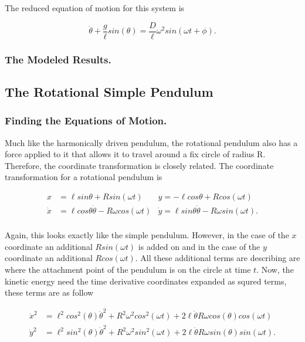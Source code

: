 \documentclass[runningheads]{llncs}
\begin{document}
The reduced equation of motion for this system is 

$$
\ddot{\theta} + \frac{g}{\ell} sin(\theta) = \frac{D}{\ell}\omega^{2} sin(\omega t + \phi).
$$

\subsubsection{The Modeled Results.}

%
%


\subsection{The Rotational Simple Pendulum}

\subsubsection{Finding the Equations of Motion.}

Much like the harmonically driven pendulum, the rotational pendulum also has a force applied to it that allows it to travel around a fix circle of radius R. Therefore, the coordinate transformation is closely related. The coordinate transformation for a rotational pendulum is

\begin{align*}
x &= \ell sin\theta + Rsin(\omega t) & y = - \ell cos\theta + Rcos(\omega t) \\
\dot{x} &= \ell cos\theta \dot{\theta} - R\omega cos(\omega t) & \dot{y} = \ell sin\theta \dot{\theta} - R\omega sin(\omega t). \\
\end{align*}

Again, this looks exactly like the simple pendulum. However, in the case of the $x$ coordinate an additional $Rsin(\omega t)$ is added on and in the case of the $y$ coordinate an additional $Rcos(\omega t)$. All these additional terms are describing are where the attachment point of the pendulum is on the circle at time $t$. Now, the kinetic energy need the time derivative coordinates expanded as squred terms, these terms are as follow

\begin{align*}
\dot{x}^{2} &= \ell^{2}cos^{2}(\theta) \dot{\theta}^{2} + R^{2}\omega^{2}cos^{2}(\omega t) + 2\ell \dot{\theta}R\omega cos(\theta)cos(\omega t) \\
\dot{y}^{2} &= \ell^{2}sin^{2}(\theta) \dot{\theta}^{2} + R^{2}\omega^{2}sin^{2}(\omega t) + 2\ell \dot{\theta}R\omega sin(\theta)sin(\omega t).
\end{align*}
\end{document}
